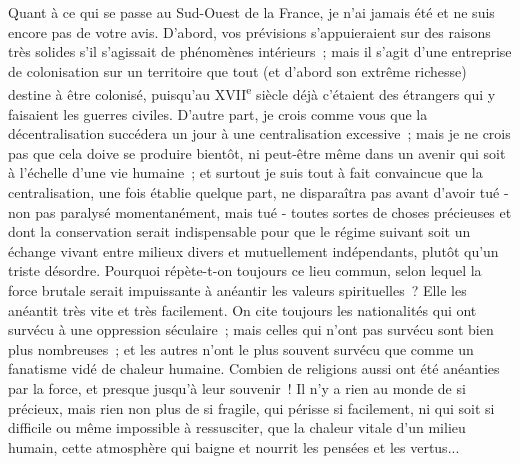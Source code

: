 \documentclass[french,twoside]{book} %
\begin{document}
Quant à ce qui se passe au Sud-Ouest de la France, je n'ai jamais été et ne suis encore pas de votre avis. D'abord, vos prévisions s'appuieraient sur des raisons très solides s'il s'agissait de phénomènes intérieurs ; mais il s'agit d'une entreprise de colonisation sur un territoire que tout (et d'abord son extrême richesse) destine à être colonisé, puisqu'au XVII\textsuperscript{e} siècle déjà c'étaient des étrangers qui y faisaient les guerres civiles. D'autre part, je crois comme vous que la décentralisation succédera un jour à une centralisation excessive ; mais je ne crois pas que cela doive se produire bientôt, ni peut-être même dans un avenir qui soit à l'échelle d'une vie humaine ; et surtout je suis tout à fait convaincue que la centralisation, une fois établie quelque part, ne disparaîtra pas avant d'avoir tué - non pas paralysé momentanément, mais tué - toutes sortes de choses précieuses et dont la conservation serait indispensable pour que le régime suivant soit un échange vivant entre milieux divers et mutuelle­ment indépendants, plutôt qu'un triste désordre. Pourquoi répète-t-on toujours ce lieu commun, selon lequel la force brutale serait impuissante à anéantir les valeurs spirituelles ? Elle les anéantit très vite et très facilement. On cite toujours les nationalités qui ont survécu à une oppression séculaire ; mais celles qui n'ont pas survécu sont bien plus nombreuses ; et les autres n'ont le plus souvent survécu que comme un fanatisme vidé de chaleur humaine. Combien de religions aussi ont été anéanties par la force, et presque jusqu'à leur souvenir ! Il n'y a rien au monde de si précieux, mais rien non plus de si fragile, qui périsse si facilement, ni qui soit si difficile ou même impossible à ressusciter, que la chaleur vitale d'un milieu humain, cette atmosphère qui baigne et nourrit les pensées et les vertus...
\end{document}
